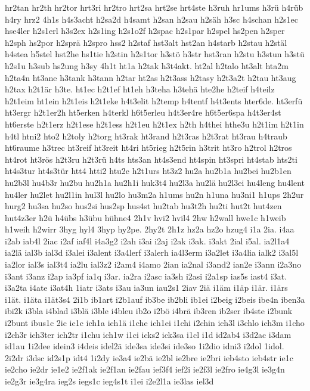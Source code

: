 {hr2tan
hr2th
hr2tor
hrt3ri
hr2tro
hrt2sa
hrt2se
hrt4ste
h3ruh
hr1ums
h3rü
h4rüb
h4ry
hrz2
4h1s
h4s3acht
h2sa2d
h4samt
h2san
h2sau
h2säh
h3sc
h4schan
h2s1ec
hse4ler
h2s1erl
h3s2ex
h2s1ing
h2s1o2f
h2spac
h2s1par
h2spel
hs2pen
h2sper
h2sph
hs2por
h2sprä
h2spro
hss2
h2staf
hst3alt
hst2an
h4starb
h2stau
h2stäl
h4stea
h5stel
hst2he
hs1tie
h2stin
h2s1tor
h3stö
h3str
hst3ran
h2stu
h3stun
h3stü
h2s1u
h3sub
hs2ung
h3sy
4h1t
ht1a
h2tak
h3t4akt.
ht2al
h2talo
ht3alt
hta2m
h2ta4n
ht3ane
h3tank
h3tann
h2tar
ht2as
h2t3ass
h2tasy
h2t3a2t
h2tau
ht3aug
h2tax
h2t1är
h3te.
ht1ec
h2t1ef
ht1eh
h3teha
h3tehä
hte2he
h2teif
h4teilz
h2t1eim
ht1ein
h2t1eis
h2t1eke
h4t3elit
h2temp
h4tentf
h4t3ents
hter6de.
ht3erfü
ht3ergr
h2t1er2h
ht5erken
h4terkl
h6t5erleu
h4t3er4re
h6t5er6spa
h4t3er4st
ht6erste
h2t1erz
h2t1ese
h2t1ess
h2t1eu
h2t1ex
h2th
h4thei
hthe3u
h2t1im
h2t1in
h4tl
htni2
hto2
h2toly
h2torg
ht3rak
ht3rand
h2t3ras
h2t3rat
ht3rau
h4traub
ht6raume
h3trec
ht3reif
ht3reit
ht4ri
ht5rieg
h2t5rin
h3trit
ht3ro
h2trol
h2tros
ht4rot
ht3rös
h2t3ru
h2t3rü
h4ts
hts3an
ht4s3end
ht4spin
ht3spri
ht4stab
hts2ti
ht4s3tur
ht4s3tür
htt4
htti2
htu2e
h2t1urs
ht3z2
hu2a
hu2b1a
hu2bei
hu2b1en
hu2b3l
hu4b3r
hu2bu
hu2h1a
hu2h1i
huk3t4
hu2l3a
hu2lä
hu2l3ei
hu4leng
hu4lent
hu4ler
hu2let
hu2l1in
hul3l
hu2lo
hu3m2a
h1ums
hu2n
h1una
hu3ni1
h1ups
2h2ur
hurg2
hu3sa
hu2so
hus2si
hus2sp
hus4st
hu2tab
hu3t2h
hu2ti
hut2t
hut4zen
hut4z3er
h2ü
h4übs
h3übu
hühne4
2h1v
hvi2
hvil4
2hw
h2wall
hwe1c
h1weib
h1weih
h2wirr
3hyg
hyl4
3hyp
hy2pe.
2hy2t
2h1z
hz2a
hz2o
hzug4
i1a
2ia.
i4aa
i2ab
iab4l
2iac
i2af
iaf4l
i4a3g2
i2ah
i3ai
i2aj
i2ak
i3ak.
i3akt
2ial
i5al.
ia2l1a4
ia2lä
ial3b
ial3d
i3alei
i3alent
i3a4lerf
i3alerh
ia4l3erm
i3a2let
i3a4lia
ialk2
i3al5l
ia2lor
ial3s
ial3t4
ia2lu
ial3z2
i2am4
i4amo
2ian
ia2nal
i3and2
ian2e
i3ann
i2a3no
i3ant
i3anz
i2ap
ia3pf
ia1q
i3ar.
ia2ra
i2asc
ia3sh
i2asi
i2a1sp
ias5s
iast4
i3at.
i3a2ta
i4ate
i3at4h
1iatr
i3ats
i3au
ia3un
iau2s1
2iav
2iä
i1äm
i1äp
i1är.
i1ärs
i1ät.
i1äta
i1ät3s4
2i1b
ib1art
i2b1auf
ib3be
ib2bli
ib1ei
i2beig
i2beis
ibe4n
iben3a
ibi2k
i3bla
i4blad
i3blä
i3ble
i4bleu
ib2o
i2bö
i4brä
ib3ren
ib2ser
ib4ste
i2bunk
i2bunt
ibus1c
2ic
ic1c
ich1a
ich1ä
i1che
ich1ei
i1chi
i2chin
ich3l
i3chlo
ich3m
i1cho
i2ch3r
ich3ter
ich2tr
i1chu
ich1w
i1ci
icks2
ick3sa
i1cl
i1d
id2ab4
i3d2ac
i3dam
id1au
1i2dee
idein3
i4deis
idel2ä
ide3sa
ide3si
ide3so
1i2dio
idni3
i2dol
1idol.
2i2dr
i3dsc
id2s1p
idt4
1i2dy
ie3a4
ie2bä
ie2bl
ie2bre
ie2bri
ieb4sto
ieb4str
ie1c
ie2cho
ie2dr
ie1e2
ie2f1ak
ie2f1an
ie2fau
ief3f4
ief2i
ie2f3l
ie2fro
ie4g3l
ie3g4n
ie2g3r
ie3g4ra
ieg2s
iegs1c
ieg4s1t
i1ei
i2e2l1a
ie3las
iel3d
}
